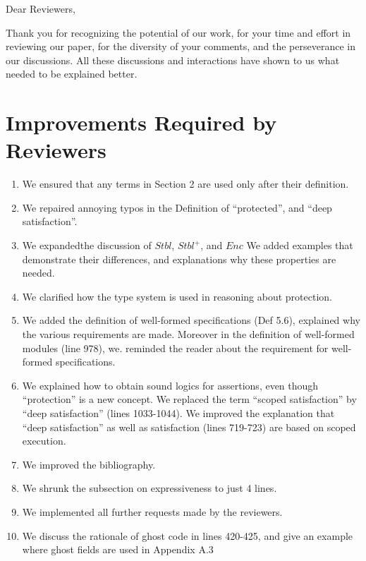 \documentclass{article}
\begin{document}
\large{
Dear Reviewers,

\vspace{.3cm}
Thank you for recognizing the potential of our work, for your time and effort in reviewing our paper, for the
diversity of your comments, and the perseverance in our discussions. All these discussions and interactions
have shown to us what needed to be explained better.

\section{ Improvements Required by Reviewers}

\begin{enumerate}
\item
We ensured that any terms in Section 2 are used only after their definition.
\item
We repaired annoying typos in the Definition of “protected”, and “deep satisfaction”.
\item
We expandedthe discussion of $Stbl$, $Stbl^+$, and  $Enc$ We added examples that demonstrate their differences, and explanations why these properties are needed.
\item
We clarified how the type system is used in reasoning about protection.
\item
We added the definition of well-formed specifications (Def 5.6), explained why the various requirements are made. Moreover in the definition of well-formed modules (line 978), we. reminded the reader about the requirement for well-formed specifications. 
\item
We explained how to obtain sound logics for assertions, even though “protection” is a new concept.
We replaced the term “scoped satisfaction” by “deep satisfaction” (lines 1033-1044). We improved the explanation that “deep satisfaction” as well as satisfaction (lines 719-723) are based on scoped execution. 
\item
We improved the bibliography.
\item
We shrunk the subsection on expressiveness to just 4 lines.
\item
We implemented all further  requests made by the reviewers.
\item We discuss the rationale of ghost code in lines 420-425, and give an example where ghost fields are used in Appendix A.3
\end{enumerate}


}
\end{document}
